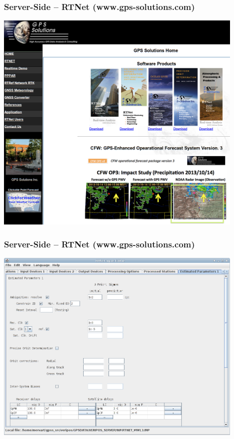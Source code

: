 \documentclass[10pt]{beamer}
\begin{document}

\begin{frame}
\frametitle{Server-Side -- RTNet (www.gps-solutions.com)}
\includegraphics[width=0.9\textwidth,angle=0]{GPSS_home.png}
\end{frame}


\begin{frame}
\frametitle{Server-Side -- RTNet (www.gps-solutions.com)}
\includegraphics[width=0.9\textwidth,angle=0]{rtnet_menu.png}
\end{frame}
\end{document}
